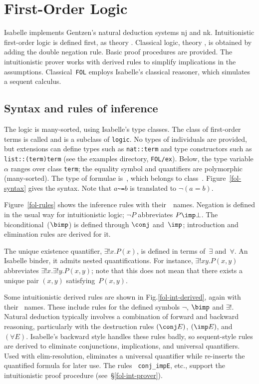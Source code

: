 \chapter{First-Order Logic}

Isabelle implements Gentzen's natural deduction systems {\sc nj} and {\sc
  nk}.  Intuitionistic first-order logic is defined first, as theory
.  Classical logic, theory , is
obtained by adding the double negation rule.  Basic proof procedures are
provided.  The intuitionistic prover works with derived rules to simplify
implications in the assumptions.  Classical~{\tt FOL} employs Isabelle's
classical reasoner, which simulates a sequent calculus.

\section{Syntax and rules of inference}
The logic is many-sorted, using Isabelle's type classes.  The class of
first-order terms is called  and is a subclass of {\tt logic}.
No types of individuals are provided, but extensions can define types such
as {\tt nat::term} and type constructors such as {\tt list::(term)term}
(see the examples directory, {\tt FOL/ex}).  Below, the type variable
$\alpha$ ranges over class {\tt term}; the equality symbol and quantifiers
are polymorphic (many-sorted).  The type of formulae is~, which
belongs to class~.  Figure~\ref{fol-syntax} gives the syntax.
Note that $a$\verb|~=|$b$ is translated to $\neg(a=b)$.

Figure~\ref{fol-rules} shows the inference rules with their~\ML\ names.
Negation is defined in the usual way for intuitionistic logic; $\neg P$
abbreviates $P\imp\bot$.  The biconditional~($\bimp$) is defined through
$\conj$ and~$\imp$; introduction and elimination rules are derived for it.

The unique existence quantifier, $\exists!x.P(x)$, is defined in terms
of~$\exists$ and~$\forall$.  An Isabelle binder, it admits nested
quantifications.  For instance, $\exists!x y.P(x,y)$ abbreviates
$\exists!x. \exists!y.P(x,y)$; note that this does not mean that there
exists a unique pair $(x,y)$ satisfying~$P(x,y)$.

Some intuitionistic derived rules are shown in
Fig.\ts\ref{fol-int-derived}, again with their \ML\ names.  These include
rules for the defined symbols $\neg$, $\bimp$ and $\exists!$.  Natural
deduction typically involves a combination of forward and backward
reasoning, particularly with the destruction rules $(\conj E)$,
$({\imp}E)$, and~$(\forall E)$.  Isabelle's backward style handles these
rules badly, so sequent-style rules are derived to eliminate conjunctions,
implications, and universal quantifiers.  Used with elim-resolution,
 eliminates a universal quantifier while 
re-inserts the quantified formula for later use.  The rules {\tt
conj_impE}, etc., support the intuitionistic proof procedure
(see~\S\ref{fol-int-prover}).

